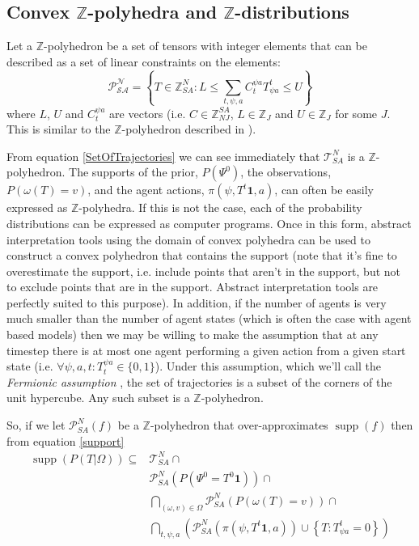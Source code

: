 \documentclass{article}
\DeclareMathOperator\supp{supp}
\begin{document}
\subsection{Convex $\mathbb{Z}$-polyhedra and $\mathbb{Z}$-distributions}
\label{BPoly}

Let a $\mathbb{Z}$-polyhedron be a set of tensors with integer elements that can be described as a set of linear constraints on the elements: 
\[
\mathcal{P^N_{SA}} = \left\{ T\in\mathbb{\mathbb{Z}}^N_{SA} : L \le \sum_{t,\psi,a} C^{\psi a}_{t} T^t_{\psi a} \le U \right\}
\]
where $L$,  $U$ and $C^{\psi a}_t$ are vectors (i.e. $C \in \mathbb{Z}^{SA}_{NJ}$, $L \in \mathbb{Z}_J$ and $U \in \mathbb{Z}_J$ for some $J$. This is similar to the $\mathbb{Z}$-polyhedron described in \cite{quinton1996manipulating}).

From equation \ref{SetOfTrajectories} we can see immediately that $\mathcal{T}^N_{SA}$ is a  $\mathbb{Z}$-polyhedron. The supports of the prior, $P(\Psi^0)$, the observations, $P(\omega(T)=v)$, and the agent actions, $\pi(\psi,T^t\mathbf{1},a)$, can often be easily expressed as $\mathbb{Z}$-polyhedra. If this is not the case, each of the probability distributions can be expressed as computer programs. Once in this form, abstract interpretation tools\cite{cousot1977abstract} using the domain of convex polyhedra  \cite{cousot1978automatic}\cite{becchi2018efficient}\cite{fukuda2020polyhedral} can be used to construct a convex polyhedron that contains the support (note that it's fine to overestimate the support, i.e. include points that aren't in the support, but not to exclude points that are in the support. Abstract interpretation tools\cite{henry2012pagai}\cite{GN2021} are perfectly suited to this purpose). In addition, if the number of agents is very much smaller than the number of agent states (which is often the case with agent based models) then we may be willing to make the assumption that at any timestep there is at most one agent performing a given action from a given start state (i.e. $\forall \psi, a, t: T^{\psi a}_t \in \{0,1\}$). Under this assumption, which we'll call the \textit{Fermionic assumption} , the set of trajectories is a subset of the corners of the unit hypercube. Any such subset is a $\mathbb{Z}$-polyhedron.

So, if we let $\mathcal{P}^N_{SA}(f)$ be a $\mathbb{Z}$-polyhedron that over-approximates $\supp(f)$ then from equation \eqref{support}
\begin{equation}
\begin{aligned}
\supp(P( T |\Omega)) \subseteq 
& \mathcal{T}^N_{SA} \cap \\
& \mathcal{P}^N_{SA}(P(\Psi^0 = T^0\mathbf{1})) \cap\\
& \bigcap_{(\omega,v) \in \Omega}   \mathcal{P}^N_{SA}\left(P\left(\omega(T)=v\right)\right) \cap \\
& \bigcap_{t,\psi, a}
\left(\mathcal{P}^N_{SA}\left(\pi(\psi,T^t\mathbf{1},a)\right)
\cup
\left\{T: T^t_{\psi a} = 0\right\}\right)
\\
\end{aligned}
\label{polyhedralSupport}
\end{equation}
\end{document}
